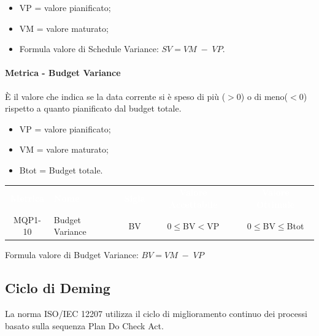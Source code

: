         \begin{itemize}
            \item VP = valore pianificato;
            \item VM = valore maturato;
            \item Formula valore di Schedule Variance: \begin{math}{SV = {VM \; - \; VP}}\end{math}.
        \end{itemize}

        \paragraph{Metrica - Budget Variance}
        È il valore che indica se la data corrente si è speso di più ($>$0) o di meno($<$0) rispetto a quanto pianificato dal budget totale.

        \begin{itemize}
            \item VP = valore pianificato;
            \item VM = valore maturato;
            \item Btot = Budget totale.
        \end{itemize}

        \renewcommand{\arraystretch}{1.5}
        \begin{longtable}{ c C{4cm} c c c}
        \textcolor{white}{\textbf{Metrica}} & \textcolor{white}{\textbf{Nome}} & \textcolor{white}{\textbf{Sigla}} & \textcolor{white}{\textbf{Valore Accettabile}} & \textcolor{white}{\textbf{Valore Ottimale}}\\
        MQP1-10 & Budget Variance & BV & 0$\leq$BV$<$VP  & 0$\leq$BV$\leq$Btot  \\	     
        \end{longtable}
        Formula valore di Budget Variance: \begin{math}{BV = {VM \; - \; VP}}\end{math}

\subsection{Ciclo di Deming}
    La norma ISO/IEC 12207 utilizza il ciclo di miglioramento continuo dei processi basato sulla sequenza Plan Do Check Act.

